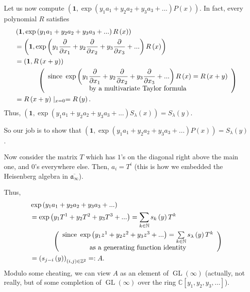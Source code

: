 \documentclass
[numbers=enddot,12pt,final,onecolumn,german,notitlepage]{scrartcl}%
\theoremstyle{definition}
\begin{document}
Let us now compute $\left(  \mathbf{1},\exp\left(  y_{1}a_{1}+y_{2}a_{2}%
+y_{3}a_{3}+...\right)  P\left(  x\right)  \right)  $. In fact, every
polynomial $R$ satisfies%
\begin{align*}
&  \left(  \mathbf{1},\exp\left(  y_{1}a_{1}+y_{2}a_{2}+y_{3}a_{3}+...\right)
R\left(  x\right)  \right) \\
&  =\left(  \mathbf{1},\exp\left(  y_{1}\dfrac{\partial}{\partial x_{1}}%
+y_{2}\dfrac{\partial}{\partial x_{2}}+y_{3}\dfrac{\partial}{\partial x_{3}%
}+...\right)  R\left(  x\right)  \right) \\
&  =\left(  \mathbf{1},R\left(  x+y\right)  \right) \\
&  \ \ \ \ \ \ \ \ \ \ \left(
\begin{array}
[c]{c}%
\text{since }\exp\left(  y_{1}\dfrac{\partial}{\partial x_{1}}+y_{2}%
\dfrac{\partial}{\partial x_{2}}+y_{3}\dfrac{\partial}{\partial x_{3}%
}+...\right)  R\left(  x\right)  =R\left(  x+y\right) \\
\text{by a multivariate Taylor formula}%
\end{array}
\right) \\
&  =R\left(  x+y\right)  \mid_{x=0}=R\left(  y\right)  .
\end{align*}
Thus, $\left(  \mathbf{1},\exp\left(  y_{1}a_{1}+y_{2}a_{2}+y_{3}%
a_{3}+...\right)  S_{\lambda}\left(  x\right)  \right)  =S_{\lambda}\left(
y\right)  $.

So our job is to show that $\left(  \mathbf{1},\exp\left(  y_{1}a_{1}%
+y_{2}a_{2}+y_{3}a_{3}+...\right)  P\left(  x\right)  \right)  =S_{\lambda
}\left(  y\right)  $.

Now consider the matrix $T$ which has $1$'s on the diagonal right above the
main one, and $0$'s everywhere else. Then, $a_{i}=T^{i}$ (this is how we
embedded the Heisenberg algebra in $\overline{\mathfrak{a}_{\infty}}$).

Thus,%
\begin{align*}
&  \exp\left(  y_{1}a_{1}+y_{2}a_{2}+y_{3}a_{3}+...\right) \\
&  =\exp\left(  y_{1}T^{1}+y_{2}T^{2}+y_{3}T^{3}+...\right)  =\sum
\limits_{k\in\mathbb{N}}s_{k}\left(  y\right)  T^{k}\\
&  \ \ \ \ \ \ \ \ \ \ \left(
\begin{array}
[c]{c}%
\text{since }\exp\left(  y_{1}z^{1}+y_{2}z^{2}+y_{3}z^{3}+...\right)
=\sum\limits_{k\in\mathbb{N}}s_{\lambda}\left(  y\right)  T^{k}\\
\text{as a generating function identity}%
\end{array}
\right) \\
&  =\left(  s_{j-i}\left(  y\right)  \right)  _{\left(  i,j\right)
\in\mathbb{Z}^{2}}=:A.
\end{align*}
Modulo some cheating, we can view $A$ as an element of $\operatorname*{GL}%
\left(  \infty\right)  $ (actually, not really, but of some completion of
$\operatorname*{GL}\left(  \infty\right)  $ over the ring $\mathbb{C}\left[
y_{1},y_{2},y_{3},...\right]  $).
\end{document}
